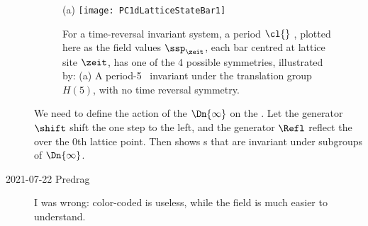 \begin{description}
\begin{figure}
  \centering
{(a)}
\texttt{[image: PC1dLatticeStateBar1]} %
  \caption{\label{fig:symmLattStatesPC}
For a time-reversal invariant system, a period $\cl{}$ {\lattstate} \Xx,
plotted here as the
field values $\ssp_\zeit$, each bar centred at lattice site
$\zeit$,  has one of the
4 possible symmetries, illustrated by:
(a)
A period-5 {\lattstate} \Xx\ invariant under the translation
group $H(5)$, with no time reversal symmetry.
          }
\end{figure}

We need to define the action of the $\Dn{\infty}$ on the {\lattstate}.
Let the generator $\shift$ shift the {\lattstate} one step to the left, and the
generator $\Refl$ reflect the {\lattstate} over the 0th lattice point. Then
 shows {\lattstate}s that are invariant
under subgroups of $\Dn{\infty}$.

\item[2021-07-22 Predrag]
I was wrong: color-coded 
is useless, while the field 
is much easier to understand.


\end{description}
